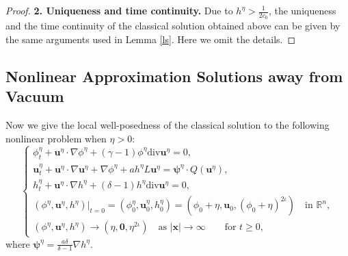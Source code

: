 \documentclass[11pt,reqno]{amsart}
\numberwithin{rk}{section}
\numberwithin{prop}{section}
\numberwithin{mydef}{section}
\numberwithin{lem}{section}
\numberwithin{equation}{section}
\numberwithin{thm}{section}
\begin{document}
\begin{proof}
\textbf{2. Uniqueness and time continuity.}  Due to  $h^\eta>\frac{1}{2c_0}$,  the uniqueness and the time continuity of the classical solution obtained above can be given by the same arguments used in Lemma \ref{ls}. Here we omit the details.
\end{proof}

\subsection{Nonlinear Approximation Solutions away from Vacuum}
Now we  give the local well-posedness of the classical solution to the following nonlinear problem when   $\eta>0$:
\begin{equation}\label{nl}
\begin{cases}
\phi^{\eta}_t+\boldsymbol{u}^{\eta}\cdot\nabla\phi^{\eta}+(\gamma-1)\phi^{\eta} \mathrm{div}\boldsymbol{u}^{\eta}=0,\\[2pt]
\displaystyle\boldsymbol{u}^{\eta}_t+\boldsymbol{u}^{\eta}\cdot \nabla \boldsymbol{u}^{\eta}+\nabla\phi^{\eta}+a h^{\eta} L\boldsymbol{u}^{\eta}= \boldsymbol{\psi}^{\eta} \cdot Q(\boldsymbol{u}^{\eta}),\\[3pt]
h^{\eta}_t+\boldsymbol{u}^\eta\cdot\nabla h^\eta+(\delta-1) h^\eta \mathrm{div} \boldsymbol{u}^{\eta}=0,\\[3pt]
(\phi^{\eta},\boldsymbol{u}^{\eta},h^{\eta})|_{t=0}=(\phi^\eta_0,\boldsymbol{u}^\eta_0,h_0^\eta)
=(\phi_0+\eta,\boldsymbol{u}_0,(\phi_0+\eta)^{2\iota})\quad \text{in $\mathbb{R}^n$},\\[3pt]
(\phi^{\eta},\boldsymbol{u}^{\eta},h^{\eta})\to (\eta,\boldsymbol{0},\eta^{2\iota}) \quad \text{as $|\boldsymbol{x}|\to \infty$} \qquad \text{for $t\geq 0$},
\end{cases}
\end{equation}
where $\boldsymbol{\psi}^\eta=\frac{a\delta}{\delta-1}\nabla h^\eta$.
\end{document}

